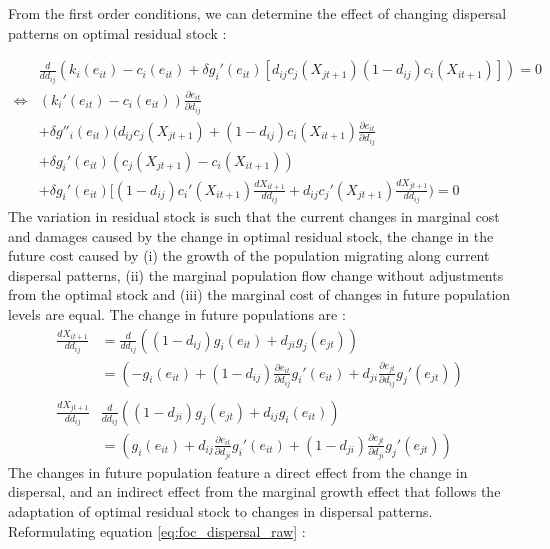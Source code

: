 From the first order conditions, we can determine the effect of changing dispersal patterns on optimal residual stock : 

\begin{align}
&\frac{d}{d d_{ij}}\left(k_i(e_{it}) - c_i(e_{it})+ \delta g_i'(e_{it})[d_{ij} c_j(X_{jt+1})  (1-d_{ij})c_i(X_{it+1})]\right) = 0 \nonumber \\
\iff 
& (k_i'(e_{it}) - c_i(e_{it})) \frac{\partial e_{it}}{\partial d_{ij}}  \\
& + \delta g''_i(e_{it})(d_{ij}c_j(X_{jt+1}) + (1-d_{ij})c_i(X_{it+1})\frac{\partial e_{it}}{\partial d_{ij}} \\
& + \delta g_i'(e_{it})(c_j(X_{jt+1}) - c_i(X_{it+1}))  \label{eq:foc_dispersal_direct_effect} \\
& + \delta g_i'(e_{it})[(1-d_{ij})c_i'(X_{it+1}) \frac{d X_{it+1}}{d d_{ij}} + d_{ij}c_j'(X_{jt+1})\frac{d X_{jt+1}}{d d_{ij}}) = 0
\label{eq:foc_dispersal_raw}
\end{align}
The variation in residual stock is such that the current changes in marginal cost and damages caused by the change in optimal residual stock, the change in the future cost caused by (i) the growth of the population migrating along current dispersal patterns, (ii) the marginal population flow change without adjustments from the optimal stock and (iii) the marginal cost of changes in future population levels are equal. The change in future populations are :
\begin{align*}
\frac{dX_{it+1}}{d d_{ij}} &= \frac{d}{d d_{ij}} \left( (1-d_{ij})g_i(e_{it}) + d_{ji} g_j(e_{jt}) \right)\\
& = \left( - g_i(e_{it}) + (1-d_{ij})\frac{\partial e_{it}}{\partial d_{ij}} g_i'(e_{it}) + d_{ji}\frac{\partial e_{jt}}{\partial d_{ij}}g_j'(e_{jt}) \right)\\
\\
\frac{dX_{jt+1}}{d d_{ij}} & \frac{d}{d d_{ij}} \left( (1-d_{ji})g_j(e_{jt}) + d_{ij} g_i(e_{it}) \right)\\
 &= \left( g_i(e_{it}) + d_{ij}\frac{\partial e_{it}}{\partial d_{ji}} g_i'(e_{it}) + (1-d_{ji})\frac{\partial e_{jt}}{\partial d_{ji}}g_j'(e_{jt}) \right)
\end{align*}
The changes in future population feature a direct effect from the change in dispersal, and an indirect effect from the marginal growth effect that follows the adaptation of optimal residual stock to changes in dispersal patterns. Reformulating equation \ref{eq:foc_dispersal_raw} : 

